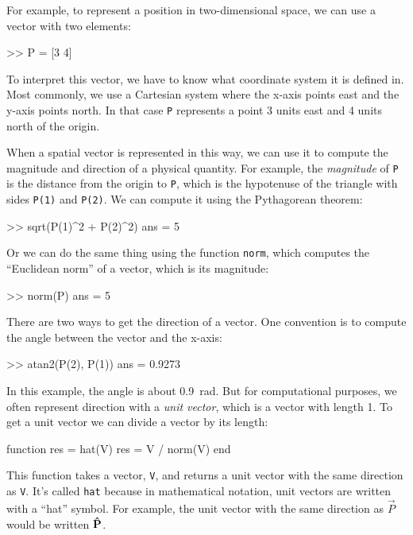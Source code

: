 For example, to represent a position in two-dimensional space, we can use a vector with two elements:

\begin{code}
>> P = [3 4]
\end{code}

To interpret this vector, we have to know what coordinate system it is defined in.  Most commonly, we use a Cartesian system where the x-axis points east and the y-axis points north.  In that case {\tt P} represents a point 3 units east and 4 units north of the origin.


When a spatial vector is represented in this way, we can use it to compute the magnitude and direction of a physical quantity.  
For example, the {\em magnitude} of {\tt P} is the distance from the origin to {\tt P}, which is the hypotenuse of the triangle with sides {\tt P(1)} and {\tt P(2)}.  
We can compute it using the Pythagorean theorem:

\begin{code}
>> sqrt(P(1)^2 + P(2)^2)
ans = 5
\end{code}

Or we can do the same thing using the function {\tt norm}, which computes the
``Euclidean norm'' of a vector, which is its magnitude:


\begin{code}
>> norm(P)
ans = 5
\end{code}

There are two ways to get the direction of a vector.  One convention is to compute the angle between the vector and the x-axis:

\begin{code}
>> atan2(P(2), P(1))
ans = 0.9273
\end{code}

In this example, the angle is about \SI{0.9}{\radian}.  But for computational purposes, we often represent direction with a \emph{unit vector}, which is a vector with length 1.  To get a unit vector we can divide a vector by its length:

\begin{code}
function res = hat(V)
    res = V / norm(V)
end
\end{code}
 
This function takes a vector, {\tt V}, and returns a unit vector with the same direction as {\tt V}.  It's called {\tt hat} because in mathematical notation, unit vectors are written with a ``hat'' symbol.  
For example, the unit vector with the same direction as $\vec{P}$ would be written $\uvec{P}$. 

